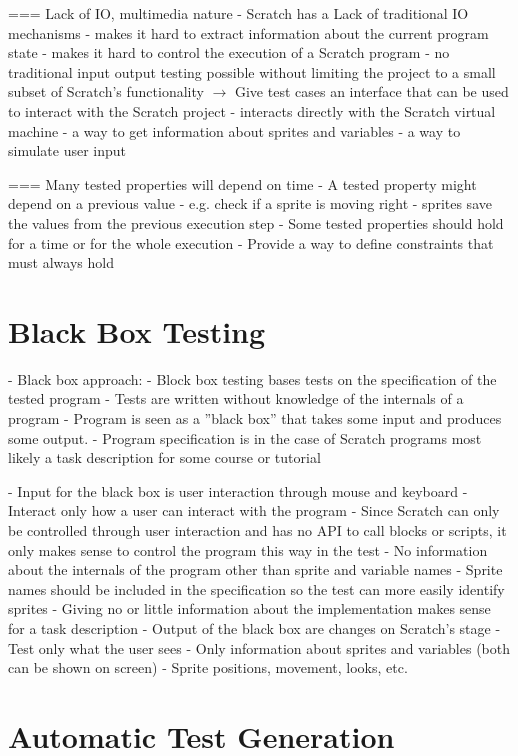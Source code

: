 === Lack of IO, multimedia nature
- Scratch has a Lack of traditional IO mechanisms
    - makes it hard to extract information about the current program state
    - makes it hard to control the execution of a Scratch program
    - no traditional input output testing possible without limiting the project to a small subset of Scratch's functionality
$\rightarrow$ Give test cases an interface that can be used to interact with the Scratch project
    - interacts directly with the Scratch virtual machine
    - a way to get information about sprites and variables
    - a way to simulate user input

=== Many tested properties will depend on time
- A tested property might depend on a previous value
    - e.g. check if a sprite is moving right
    - sprites save the values from the previous execution step
- Some tested properties should hold for a time or for the whole execution
    - Provide a way to define constraints that must always hold

\section{Black Box Testing}

- Black box approach:
    - Block box testing bases tests on the specification of the tested program
    - Tests are written without knowledge of the internals of a program
    - Program is seen as a ''black box'' that takes some input and produces some output.
    - Program specification is in the case of Scratch programs most likely a task description for some course or tutorial

    - Input for the black box is user interaction through mouse and keyboard
    - Interact only how a user can interact with the program
        - Since Scratch can only be controlled through user interaction and has no API to call blocks or scripts,
          it only makes sense to control the program this way in the test
        - No information about the internals of the program other than sprite and variable names
            - Sprite names should be included in the specification so the test can more easily identify sprites
            - Giving no or little information about the implementation makes sense for a task description
    - Output of the black box are changes on Scratch's stage
    - Test only what the user sees
        - Only information about sprites and variables (both can be shown on screen)
        - Sprite positions, movement, looks, etc.

\section{Automatic Test Generation}%
\label{sec:automatic_test_generation}


